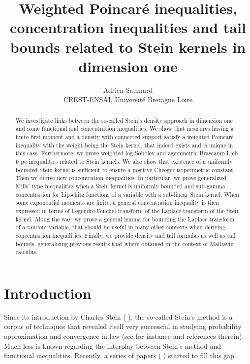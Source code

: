 \documentclass[11pt]{article}
\begin{document}
\title{Weighted Poincar\'{e} inequalities, concentration inequalities and
tail bounds related to Stein kernels in dimension one}
\author{Adrien Saumard \\
CREST-ENSAI, Universit\'{e} Bretagne Loire}
\maketitle

\begin{abstract}
We investigate links between the so-called Stein's density approach in
dimension one and some functional and concentration inequalities. We show
that measures having a finite first moment and a density with connected
support satisfy a weighted Poincar\'{e} inequality with the weight being the
Stein kernel, that indeed exists and is unique in this case. Furthermore, we
prove weighted log-Sobolev and asymmetric Brascamp-Lieb type inequalities
related to Stein kernels. We also show that existence of a uniformly bounded
Stein kernel is sufficient to ensure a positive Cheeger isoperimetric
constant. Then we derive new concentration inequalities. In particular, we
prove generalized Mills' type inequalities when a Stein kernel is uniformly
bounded and sub-gamma concentration for Lipschitz functions of a variable
with a sub-linear Stein kernel. When some exponential moments are finite, a
general concentration inequality is then expressed in terms of
Legendre-Fenchel transform of the Laplace transform of the Stein kernel.
Along the way, we prove a general lemma for bounding the Laplace transform
of a random variable, that should be useful in many other contexts when
deriving concentration inequalities. Finally, we provide density and tail
formulas as well as tail bounds, generalizing previous results that where
obtained in the context of Malliavin calculus.

\noindent
\end{abstract}

\section{Introduction}

Since its introduction by Charles Stein (%
\cite{MR0402873, MR882007}%
), the so-called Stein's method is a corpus of techniques that revealed
itself very successful in studying probability approximation and convergence
in law (see for instance 
\cite{MR2732624, MR3727600, MR3595350}
and references therein). Much less is known regarding the interplay between
Stein's method and functional inequalities. Recently, a series of papers (%
\cite{LedoucNourdinPeccati:15,  MR3665794,  MR3682667, courtade2017existence}%
) started to fill this gap.
\end{document}
